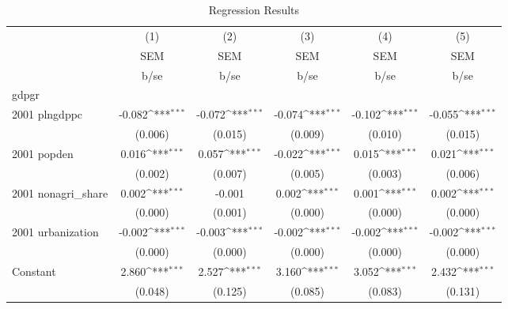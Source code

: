 \begin{table}[htbp]\centering
\def\sym#1{\ifmmode^{#1}\else\(^{#1}\)\fi}
\caption{Regression Results}
\begin{tabular}{l*{5}{c}}
\hline\hline
                    &\multicolumn{1}{c}{(1)}&\multicolumn{1}{c}{(2)}&\multicolumn{1}{c}{(3)}&\multicolumn{1}{c}{(4)}&\multicolumn{1}{c}{(5)}\\
                    &\multicolumn{1}{c}{SEM}&\multicolumn{1}{c}{SEM}&\multicolumn{1}{c}{SEM}&\multicolumn{1}{c}{SEM}&\multicolumn{1}{c}{SEM}\\
                    &        b/se         &        b/se         &        b/se         &        b/se         &        b/se         \\
\hline
gdpgr               &                     &                     &                     &                     &                     \\
2001 plngdppc       &      -0.082\sym{***}&      -0.072\sym{***}&      -0.074\sym{***}&      -0.102\sym{***}&      -0.055\sym{***}\\
                    &     (0.006)         &     (0.015)         &     (0.009)         &     (0.010)         &     (0.015)         \\
2001 popden         &       0.016\sym{***}&       0.057\sym{***}&      -0.022\sym{***}&       0.015\sym{***}&       0.021\sym{***}\\
                    &     (0.002)         &     (0.007)         &     (0.005)         &     (0.003)         &     (0.006)         \\
2001 nonagri\_share  &       0.002\sym{***}&      -0.001         &       0.002\sym{***}&       0.001\sym{***}&       0.002\sym{***}\\
                    &     (0.000)         &     (0.001)         &     (0.000)         &     (0.000)         &     (0.000)         \\
2001 urbanization   &      -0.002\sym{***}&      -0.003\sym{***}&      -0.002\sym{***}&      -0.002\sym{***}&      -0.002\sym{***}\\
                    &     (0.000)         &     (0.000)         &     (0.000)         &     (0.000)         &     (0.000)         \\
Constant            &       2.860\sym{***}&       2.527\sym{***}&       3.160\sym{***}&       3.052\sym{***}&       2.432\sym{***}\\
                    &     (0.048)         &     (0.125)         &     (0.085)         &     (0.083)         &     (0.131)         \\

\end{tabular}
\end{table}
